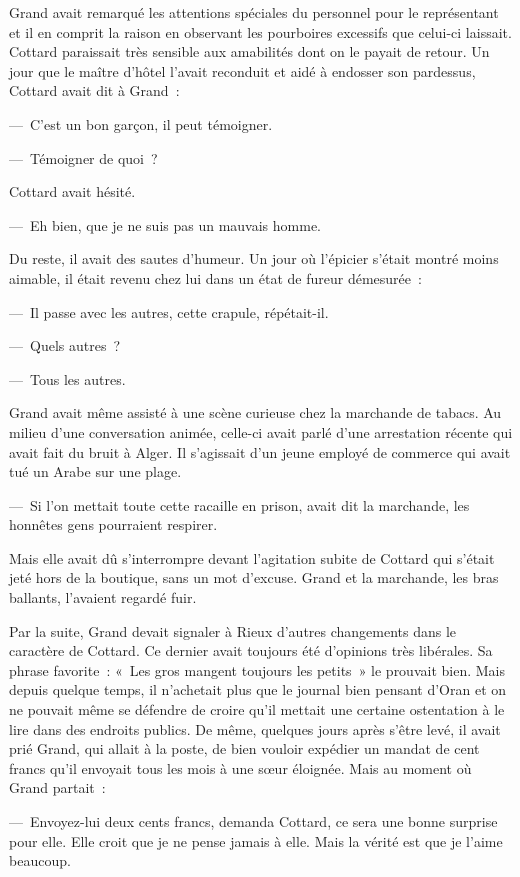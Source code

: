 \documentclass[french,twoside]{book} %
\begin{document}
Grand avait remarqué les attentions spéciales du personnel pour le représentant et il en comprit la raison en observant les pourboires excessifs que celui-ci laissait. Cottard paraissait très sensible aux amabilités dont on le payait de retour. Un jour que le maître d’hôtel l’avait reconduit et aidé à endosser son pardessus, Cottard avait dit à Grand :\par
— C’est un bon garçon, il peut témoigner.\par
— Témoigner de quoi ?\par
Cottard avait hésité.\par
— Eh bien, que je ne suis pas un mauvais homme.\par
Du reste, il avait des sautes d’humeur. Un jour où l’épicier s’était montré moins aimable, il était revenu chez lui dans un état de fureur démesurée :\par
— Il passe avec les autres, cette crapule, répétait-il.\par
— Quels autres ?\par
— Tous les autres.\par
Grand avait même assisté à une scène curieuse chez la marchande de tabacs. Au milieu d’une conversation animée, celle-ci avait parlé d’une arrestation récente qui avait fait du bruit à Alger. Il s’agissait d’un jeune employé de commerce qui avait tué un Arabe sur une plage.\par
— Si l’on mettait toute cette racaille en prison, avait dit la marchande, les honnêtes gens pourraient respirer.\par
Mais elle avait dû s’interrompre devant l’agitation subite de Cottard qui s’était jeté hors de la boutique, sans un mot d’excuse. Grand et la marchande, les bras ballants, l’avaient regardé fuir.\par
Par la suite, Grand devait signaler à Rieux d’autres changements dans le caractère de Cottard. Ce dernier avait toujours été d’opinions très libérales. Sa phrase favorite : « Les gros mangent toujours les petits » le prouvait bien. Mais depuis quelque temps, il n’achetait plus que le journal bien pensant d’Oran et on ne pouvait même se défendre de croire qu’il mettait une certaine ostentation à le lire dans des endroits publics. De même, quelques jours après s’être levé, il avait prié Grand, qui allait à la poste, de bien vouloir expédier un mandat de cent francs qu’il envoyait tous les mois à une sœur éloignée. Mais au moment où Grand partait :\par
— Envoyez-lui deux cents francs, demanda Cottard, ce sera une bonne surprise pour elle. Elle croit que je ne pense jamais à elle. Mais la vérité est que je l’aime beaucoup.\par
\end{document}
